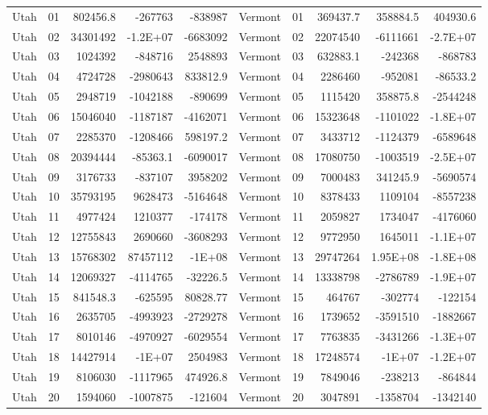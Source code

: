 \begin{landscape}
\begin{singlespace}
\begin{longtable}{lrrrr|lrrrr}
		Utah &  01  & 802456.8 & -267763 & -838987 & Vermont &  01  & 369437.7 & 358884.5 & 404930.6 \\
		Utah &  02  & 34301492 & -1.2E+07 & -6683092 & Vermont &  02  & 22074540 & -6111661 & -2.7E+07 \\
		Utah &  03  & 1024392 & -848716 & 2548893 & Vermont &  03  & 632883.1 & -242368 & -868783 \\
		Utah &  04  & 4724728 & -2980643 & 833812.9 & Vermont &  04  & 2286460 & -952081 & -86533.2 \\
		Utah &  05  & 2948719 & -1042188 & -890699 & Vermont &  05  & 1115420 & 358875.8 & -2544248 \\
		Utah &  06  & 15046040 & -1187187 & -4162071 & Vermont &  06  & 15323648 & -1101022 & -1.8E+07 \\
		Utah &  07  & 2285370 & -1208466 & 598197.2 & Vermont &  07  & 3433712 & -1124379 & -6589648 \\
		Utah &  08  & 20394444 & -85363.1 & -6090017 & Vermont &  08  & 17080750 & -1003519 & -2.5E+07 \\
		Utah &  09  & 3176733 & -837107 & 3958202 & Vermont &  09  & 7000483 & 341245.9 & -5690574 \\
		Utah &  10 & 35793195 & 9628473 & -5164648 & Vermont &  10 & 8378433 & 1109104 & -8557238 \\
		Utah &  11 & 4977424 & 1210377 & -174178 & Vermont &  11 & 2059827 & 1734047 & -4176060 \\
		Utah &  12 & 12755843 & 2690660 & -3608293 & Vermont &  12 & 9772950 & 1645011 & -1.1E+07 \\
		Utah &  13 & 15768302 & 87457112 & -1E+08 & Vermont &  13 & 29747264 & 1.95E+08 & -1.8E+08 \\
		Utah &  14 & 12069327 & -4114765 & -32226.5 & Vermont &  14 & 13338798 & -2786789 & -1.9E+07 \\
		Utah &  15 & 841548.3 & -625595 & 80828.77 & Vermont &  15 & 464767 & -302774 & -122154 \\
		Utah &  16 & 2635705 & -4993923 & -2729278 & Vermont &  16 & 1739652 & -3591510 & -1882667 \\
		Utah &  17 & 8010146 & -4970927 & -6029554 & Vermont &  17 & 7763835 & -3431266 & -1.3E+07 \\
		Utah &  18 & 14427914 & -1E+07 & 2504983 & Vermont &  18 & 17248574 & -1E+07 & -1.2E+07 \\
		Utah &  19 & 8106030 & -1117965 & 474926.8 & Vermont &  19 & 7849046 & -238213 & -864844 \\
		Utah &  20 & 1594060 & -1007875 & -121604 & Vermont &  20 & 3047891 & -1358704 & -1342140 \\

\end{longtable}
\end{singlespace}
\end{landscape}
